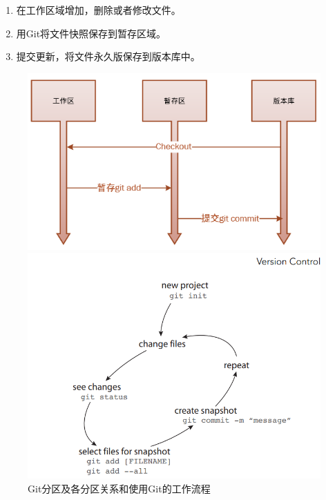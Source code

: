 \begin{enumerate}
    \item 在工作区域增加，删除或者修改文件。
    \item 用Git将文件快照保存到暂存区域。
    \item 提交更新，将文件永久版保存到版本库中。
\end{enumerate}

\begin{figure}[ht]
    \centering
    \begin{minipage}[c]{0.45\textwidth}
        \includegraphics[width=\textwidth]{image/git/git-subarea.png}
    \end{minipage}
    \begin{minipage}[c]{0.45\textwidth}
        \includegraphics[width=\textwidth]{image/git/git-workflow.PNG}
    \end{minipage}
    \caption{Git分区及各分区关系和使用Git的工作流程}
    \label{git-workflow}
\end{figure}

